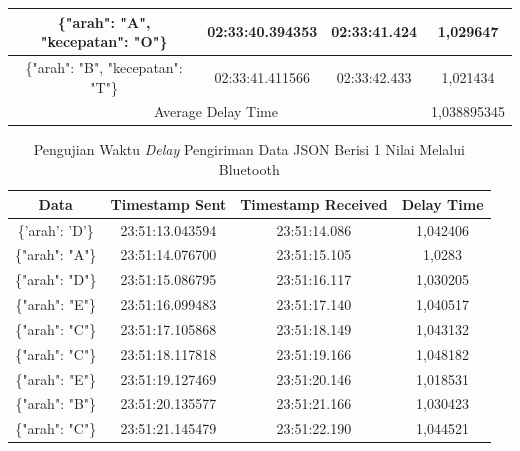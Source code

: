 \begin{table}[htpb]
\begin{tabular}{|ccc|c|}
  \multicolumn{1}{|c|}{\{"arah": "A", "kecepatan": "O"\}} & \multicolumn{1}{c|}{02:33:40.394353} & 02:33:41.424       & 1,029647    \\ \hline
  \multicolumn{1}{|c|}{\{"arah": "B", "kecepatan": "T"\}} & \multicolumn{1}{c|}{02:33:41.411566} & 02:33:42.433       & 1,021434    \\ \hline
  \multicolumn{3}{|c|}{Average Delay Time}                                                                            & 1,038895345 \\ \hline
  \end{tabular}
  \end{table}

\begin{table}[htpb]
  \centering
  \caption{Pengujian Waktu \emph{Delay} Pengiriman Data JSON Berisi 1 Nilai Melalui Bluetooth}
  \label{tbl:delayBluetoothJSON1}
  \begin{tabular}{|ccc|c|}
  \hline
  \multicolumn{1}{|c|}{Data}            & \multicolumn{1}{c|}{Timestamp Sent}  & Timestamp Received & Delay Time  \\ \hline
  \multicolumn{1}{|c|}{\{'arah': 'D'\}} & \multicolumn{1}{c|}{23:51:13.043594} & 23:51:14.086       & 1,042406    \\ \hline
  \multicolumn{1}{|c|}{\{"arah": "A"\}} & \multicolumn{1}{c|}{23:51:14.076700} & 23:51:15.105       & 1,0283      \\ \hline
  \multicolumn{1}{|c|}{\{"arah": "D"\}} & \multicolumn{1}{c|}{23:51:15.086795} & 23:51:16.117       & 1,030205    \\ \hline
  \multicolumn{1}{|c|}{\{"arah": "E"\}} & \multicolumn{1}{c|}{23:51:16.099483} & 23:51:17.140       & 1,040517    \\ \hline
  \multicolumn{1}{|c|}{\{"arah": "C"\}} & \multicolumn{1}{c|}{23:51:17.105868} & 23:51:18.149       & 1,043132    \\ \hline
  \multicolumn{1}{|c|}{\{"arah": "C"\}} & \multicolumn{1}{c|}{23:51:18.117818} & 23:51:19.166       & 1,048182    \\ \hline
  \multicolumn{1}{|c|}{\{"arah": "E"\}} & \multicolumn{1}{c|}{23:51:19.127469} & 23:51:20.146       & 1,018531    \\ \hline
  \multicolumn{1}{|c|}{\{"arah": "B"\}} & \multicolumn{1}{c|}{23:51:20.135577} & 23:51:21.166       & 1,030423    \\ \hline
  \multicolumn{1}{|c|}{\{"arah": "C"\}} & \multicolumn{1}{c|}{23:51:21.145479} & 23:51:22.190       & 1,044521    \\ \hline

\end{tabular}
\end{table}
